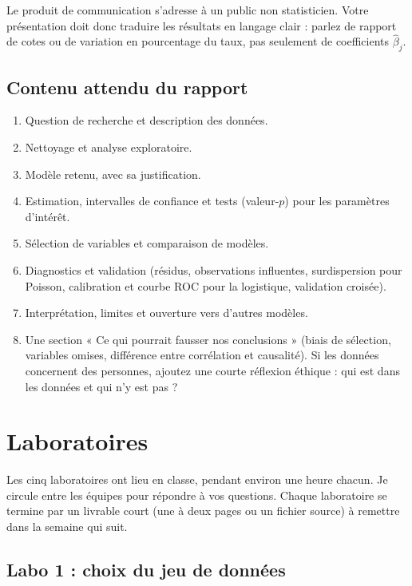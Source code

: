 \documentclass[11pt,letterpaper]{scrartcl}
\begin{document}
Le produit de communication s'adresse à un public non statisticien. Votre présentation doit donc traduire les résultats en langage clair : parlez de rapport de cotes ou de variation en pourcentage du taux, pas seulement de coefficients $\hat\beta_j$.

\subsection{Contenu attendu du rapport}

\begin{enumerate}
  \item Question de recherche et description des données.
  \item Nettoyage et analyse exploratoire.
  \item Modèle retenu, avec sa justification.
  \item Estimation, intervalles de confiance et tests (valeur-$p$) pour les paramètres d'intérêt.
  \item Sélection de variables et comparaison de modèles.
  \item Diagnostics et validation (résidus, observations influentes, surdispersion pour Poisson, calibration et courbe ROC pour la logistique, validation croisée).
  \item Interprétation, limites et ouverture vers d'autres modèles.
  \item Une section « Ce qui pourrait fausser nos conclusions » (biais de sélection, variables omises, différence entre corrélation et causalité). Si les données concernent des personnes, ajoutez une courte réflexion éthique : qui est dans les données et qui n'y est pas ?
\end{enumerate}

\section{Laboratoires}

Les cinq laboratoires ont lieu en classe, pendant environ une heure chacun. Je circule entre les équipes pour répondre à vos questions. Chaque laboratoire se termine par un livrable court (une à deux pages ou un fichier source) à remettre dans la semaine qui suit.

\subsection{Labo 1 : choix du jeu de données}
\end{document}
